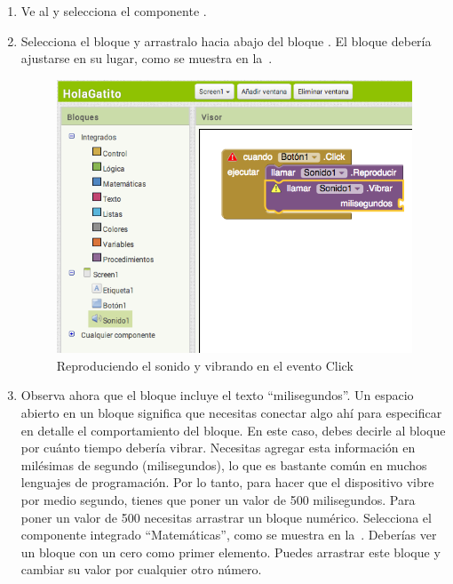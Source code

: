 \documentclass[letterpaper]{article}
\begin{document}
\begin{enumerate}

\item Ve al \blockEditor y selecciona el componente
  .

\item Selecciona el bloque  y arrastralo
  hacia abajo del bloque . El bloque
  debería ajustarse en su lugar, como se muestra en
  la~.

\begin{figure}[H]
\centering
\includegraphics[scale=0.25]{figures/button1ClickPlayVibrate}
\caption{Reproduciendo el sonido y vibrando en el evento Click}
\label{fig:button1ClickPlayVibrate}
\end{figure}

\item Observa ahora que el bloque 
  incluye el texto ``milisegundos''. Un espacio abierto en un bloque
  significa que necesitas conectar algo ahí para especificar en
  detalle el comportamiento del bloque. En este caso, debes decirle al
  bloque por cuánto tiempo debería vibrar. Necesitas agregar esta
  información en milésimas de segundo (milisegundos), lo que es
  bastante común en muchos lenguajes de programación. Por lo tanto,
  para hacer que el dispositivo vibre por medio segundo, tienes que
  poner un valor de 500 milisegundos. Para poner un valor de 500
  necesitas arrastrar un bloque numérico. Selecciona el componente
  integrado ``Matemáticas'', como se muestra en la~\Cref{}. Deberías
  ver un bloque con un cero como primer elemento. Puedes arrastrar
  este bloque y cambiar su valor por cualquier otro número.


\end{enumerate}
\end{document}
